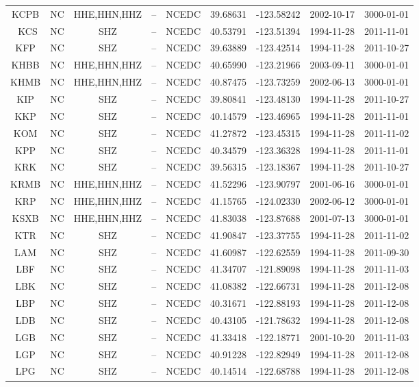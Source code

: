 \documentclass[draft]{agujournal2019}
\begin{document}
{\begin{table}
\begin{tabular}{c c c c c c c c c}
KCPB & NC & HHE,HHN,HHZ & -- & NCEDC & 39.68631 & -123.58242 & 2002-10-17 & 3000-01-01 \\\
KCS & NC & SHZ & -- & NCEDC & 40.53791 & -123.51394 & 1994-11-28 & 2011-11-01 \\
KFP & NC & SHZ & -- & NCEDC & 39.63889 & -123.42514 & 1994-11-28 & 2011-10-27 \\
KHBB & NC & HHE,HHN,HHZ & -- & NCEDC & 40.65990 & -123.21966 & 2003-09-11 & 3000-01-01 \\
KHMB & NC & HHE,HHN,HHZ & -- & NCEDC & 40.87475 & -123.73259 & 2002-06-13 & 3000-01-01 \\
KIP & NC & SHZ & -- & NCEDC & 39.80841 & -123.48130 & 1994-11-28 & 2011-10-27 \\
KKP & NC & SHZ & -- & NCEDC & 40.14579 & -123.46965 & 1994-11-28 & 2011-11-01 \\
KOM & NC & SHZ & -- & NCEDC & 41.27872 & -123.45315 & 1994-11-28 & 2011-11-02 \\
KPP & NC & SHZ & -- & NCEDC & 40.34579 & -123.36328 & 1994-11-28 & 2011-11-01 \\
KRK & NC & SHZ & -- & NCEDC & 39.56315 & -123.18367 & 1994-11-28 & 2011-10-27 \\
KRMB & NC & HHE,HHN,HHZ & -- & NCEDC & 41.52296 & -123.90797 & 2001-06-16 & 3000-01-01 \\
KRP & NC & HHE,HHN,HHZ & -- & NCEDC & 41.15765 & -124.02330 & 2002-06-12 & 3000-01-01 \\
KSXB & NC & HHE,HHN,HHZ & -- & NCEDC & 41.83038 & -123.87688 & 2001-07-13 & 3000-01-01 \\
KTR & NC & SHZ & -- & NCEDC & 41.90847 & -123.37755 & 1994-11-28 & 2011-11-02 \\
LAM & NC & SHZ & -- & NCEDC & 41.60987 & -122.62559 & 1994-11-28 & 2011-09-30 \\
LBF & NC & SHZ & -- & NCEDC & 41.34707 & -121.89098 & 1994-11-28 & 2011-11-03 \\
LBK & NC & SHZ & -- & NCEDC & 41.08382 & -122.66731 & 1994-11-28 & 2011-12-08 \\
LBP & NC & SHZ & -- & NCEDC & 40.31671 & -122.88193 & 1994-11-28 & 2011-12-08 \\
LDB & NC & SHZ & -- & NCEDC & 40.43105 & -121.78632 & 1994-11-28 & 2011-12-08 \\
LGB & NC & SHZ & -- & NCEDC & 41.33418 & -122.18771 & 2001-10-20 & 2011-11-03 \\
LGP & NC & SHZ & -- & NCEDC & 40.91228 & -122.82949 & 1994-11-28 & 2011-12-08 \\
LPG & NC & SHZ & -- & NCEDC & 40.14514 & -122.68788 & 1994-11-28 & 2011-12-08 \\

\end{tabular}
\end{table}}
\end{document}
